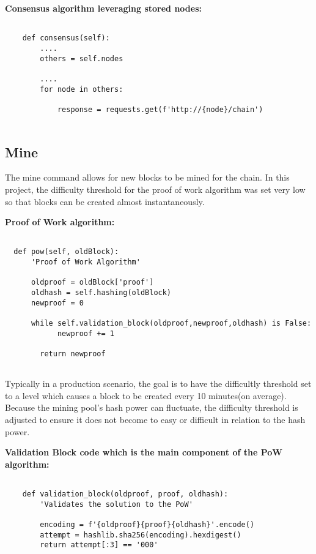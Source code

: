 \bigskip
\noindent
\textbf{Consensus algorithm leveraging stored nodes:}
\begin{footnotesize}
\begin{verbatim}

    def consensus(self):
        ....
        others = self.nodes
        
        ....
        for node in others:

            response = requests.get(f'http://{node}/chain')
        
\end{verbatim}
\end{footnotesize}

\subsection{Mine}

The mine command allows for new blocks to be mined for the chain. In this project, the difficulty threshold for the proof of work algorithm was set very low so that blocks can be created almost instantaneously. 

\bigskip
\noindent
\textbf{Proof of Work algorithm:}
\begin{footnotesize}
\begin{verbatim}

  def pow(self, oldBlock):
      'Proof of Work Algorithm'

      oldproof = oldBlock['proof']
      oldhash = self.hashing(oldBlock)
      newproof = 0

      while self.validation_block(oldproof,newproof,oldhash) is False:
            newproof += 1

        return newproof
        
\end{verbatim}
\end{footnotesize}

Typically in a production scenario, the goal is to have the difficultly threshold set to a level which causes a block to be created every 10 minutes(on average). Because the mining pool's hash power can fluctuate, the difficulty threshold is adjusted to ensure it does not become to easy or difficult in relation to the hash power.~\cite{hid-sp18-414-www-pow-vs-pos}

\bigskip
\noindent
\textbf{Validation Block code which is the main component of the PoW algorithm:}
\begin{footnotesize}
\begin{verbatim}

    def validation_block(oldproof, proof, oldhash):
        'Validates the solution to the PoW'

        encoding = f'{oldproof}{proof}{oldhash}'.encode()
        attempt = hashlib.sha256(encoding).hexdigest()
        return attempt[:3] == '000'

        
\end{verbatim}
\end{footnotesize}


